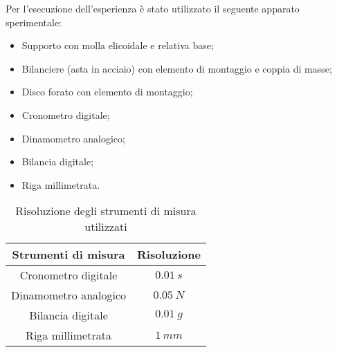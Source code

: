 Per l'esecuzione dell'esperienza è stato utilizzato il seguente apparato sperimentale:
\begin{itemize}
	\item Supporto con molla elicoidale e relativa base;
	\item Bilanciere (asta in acciaio) con elemento di montaggio e coppia di masse;
	\item Disco forato con elemento di montaggio;
	\item Cronometro digitale;
	\item Dinamometro analogico;
	\item Bilancia digitale;
	\item Riga millimetrata.
\end{itemize}

\begin{table}[H]
	\centering
	\begin{tabular}{|c|c|}
		\hline
		\textbf{Strumenti di misura} & \textbf{Risoluzione} \\
		\hline
		Cronometro digitale & $0.01\ s$ \\
		Dinamometro analogico & $0.05\ N$ \\
		Bilancia digitale & $0.01\ g$ \\
		Riga millimetrata & $1\ mm$ \\
		\hline
	\end{tabular}
	\caption{Risoluzione degli strumenti di misura utilizzati}
	\label{tab:}
\end{table}